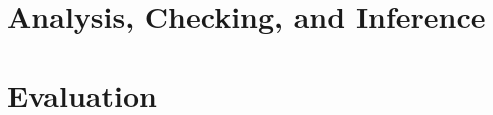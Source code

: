 \documentclass[acmlarge,review,anonymous]{acmart}\settopmatter{printfolios=true}
\theoremstyle{definition}
\theoremstyle{plain}
\theoremstyle{remark}
\begin{document}
\section{Analysis, Checking, and Inference}
\label{sec:algorithms}


\section{Evaluation}
\label{sec:evaluation}




\appendix

\end{document}

